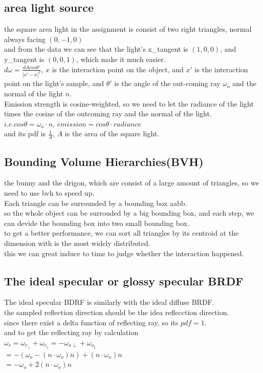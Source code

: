 \documentclass[acmtog]{acmart}
\begin{document}
\subsection{area light source}
the square area light in the assignment is consist of two right triangles, normal always facing $(0,-1,0)$\\
and from the data we can see that the light's x\_tangent is $(1,0,0)$, and y\_tangent is $(0,0,1)$, which make it much easier.\\
$d\omega = \frac{dAcos\theta'}{|x' - x|^2} $, $x$ is the interaction point on the object, and $x'$ is the interaction point on the light's sample, and
$\theta'$ is the angle of the out-coming ray $\omega_o$ and the normal of the light $n$.\\
Emission strength is cosine-weighted, so we need to let the radiance of the light times the cosine of the outcoming ray and the normal of the light. $i.e. cos\theta = \omega_o \cdot n$,
$emission = cos\theta \cdot radiance$\\
and its pdf is $\frac{1}{A}$, $A$ is the area of the square light.\\

\subsection{Bounding Volume Hierarchies(BVH)}
the bunny and the drigon, which are consist of a large amount of triangles, so we need to use bvh to speed up.\\
Each triangle can be surrounded by a bounding box aabb.\\
so the whole object can be surrouded by a big bounding box, and each step, we can devide the bounding box into two small 
bounding box.\\
to get a better performance, we can sort all triangles by its centroid at the dimension with is the most widely distributed.\\
this we can great induce to time to judge whether the interaction happened.

\subsection{The ideal specular or glossy specular BRDF}
The ideal specular BDRF is similarly with the ideal diffuse BRDF.\\
the sampled reflection direction should be the idea reflecction direction.\\
since there exist a delta function of reflecting ray, so its $pdf = 1$.\\
and to get the reflecting ray by calculation\\
$\omega_r = \omega_{r_\perp} + \omega_{r_\parallel} = -\omega_{o\perp} + \omega_{o_\parallel}$\\
$=-(\omega_o-(n\cdot \omega_o)n)+(n\cdot \omega_o)n$\\
$=-\omega_o+2(n\cdot \omega_o)n$\\
\end{document}
